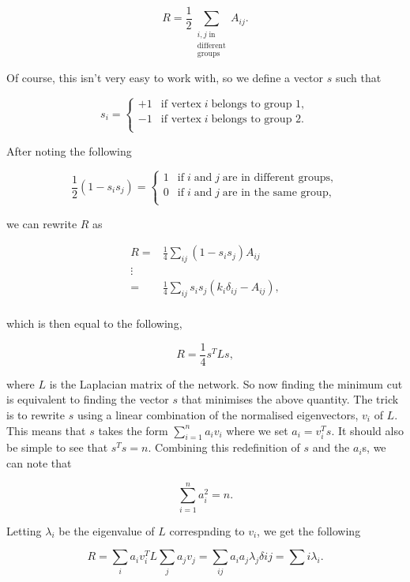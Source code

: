 $$ R = \frac{1}{2} \sum_{\substack{i, j \; \text{in} \\ \text{different} \\ \text{groups}}} A_{ij}. $$

\noindent
Of course, this isn't very easy to work with, so we define a vector $s$ such that

$$ s_i = 
\begin{cases}
    +1 & \text{if vertex} \; i \; \text{belongs to group 1}, \\
    -1 & \text{if vertex} \; i \; \text{belongs to group 2}. \\
\end{cases}
$$

\noindent
After noting the following

$$ \frac{1}{2}(1 - s_i s_j) = 
\begin{cases}
    1 & \text{if} \; i \; \text{and} \; j \; \text{are in different groups}, \\
    0 & \text{if} \; i \; \text{and} \; j \; \text{are in the same group}, \\
\end{cases}
$$

\noindent
we can rewrite $R$ as

$$
\begin{aligned}
    R =& \frac{1}{4}\sum_{ij}(1 - s_i s_j)A_{ij} \\
      \vdots & \\
      =& \frac{1}{4}\sum_{ij}s_i s_j(k_i\delta_{ij} - A_{ij}), \\
\end{aligned}
$$

\noindent
which is then equal to the following,

$$ R = \frac{1}{4}s^TLs, $$

\noindent
where $L$ is the Laplacian matrix of the network. So now finding the minimum cut is equivalent to finding the vector $s$ that minimises the above quantity. The trick is to rewrite $s$ using a linear combination of the normalised eigenvectors, $v_i$ of $L$. This means that $s$ takes the form $\sum_{i=1}^n a_iv_i$ where we set $a_i = v_i^T s$. It should also be simple to see that $s^Ts = n$. Combining this redefinition of $s$ and the $a_i$s, we can note that

$$ \sum_{i=1}^n a_i^2 = n. $$

\noindent
Letting $\lambda_i$ be the eigenvalue of $L$ correspnding to $v_i$, we get the following

$$ R = \sum_i a_iv_i^TL\sum_ja_jv_j = \sum_{ij}a_ia_j\lambda_j\delta{ij} = \sum{i}\lambda_i. $$

